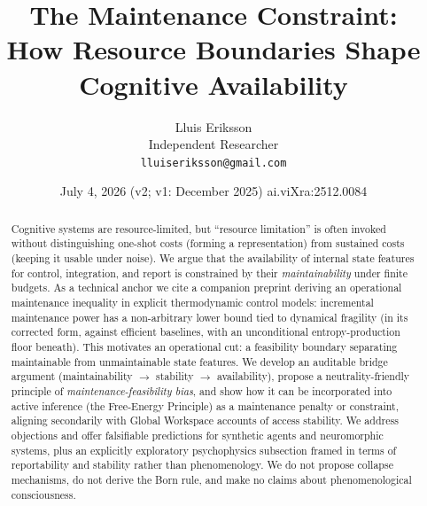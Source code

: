 \documentclass[11pt,a4paper]{article}
\title{The Maintenance Constraint:\\
How Resource Boundaries Shape Cognitive Availability}
\author{Lluis Eriksson\\ \small Independent Researcher\\
\small \texttt{lluiseriksson@gmail.com}}
\date{July 4, 2026 \quad (v2; v1: December 2025) \quad ai.viXra:2512.0084}
\begin{document}
\maketitle

\begin{center}
\end{center}

\begin{abstract}
Cognitive systems are resource-limited, but ``resource limitation'' is often
invoked without distinguishing one-shot costs (forming a representation) from
sustained costs (keeping it usable under noise). We argue that the
availability of internal state features for control, integration, and report
is constrained by their \emph{maintainability} under finite budgets. As a
technical anchor we cite a companion preprint deriving an operational
maintenance inequality in explicit thermodynamic control models: incremental
maintenance power has a non-arbitrary lower bound tied to dynamical fragility
(in its corrected form, against efficient baselines, with an unconditional
entropy-production floor beneath). This motivates an operational cut: a
feasibility boundary separating maintainable from unmaintainable state
features. We develop an auditable bridge argument (maintainability $\to$
stability $\to$ availability), propose a neutrality-friendly principle of
\emph{maintenance-feasibility bias}, and show how it can be incorporated into
active inference (the Free-Energy Principle) as a maintenance penalty or
constraint, aligning secondarily with Global Workspace accounts of access
stability. We address objections and offer falsifiable predictions for
synthetic agents and neuromorphic systems, plus an explicitly exploratory
psychophysics subsection framed in terms of reportability and stability
rather than phenomenology. We do not propose collapse mechanisms, do not
derive the Born rule, and make no claims about phenomenological
consciousness.
\end{abstract}
\end{document}
